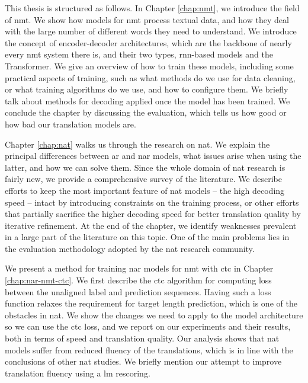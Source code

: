 

\vspace{\baselineskip}

This thesis is structured as follows.
%
In Chapter \ref{chap:nmt}, we introduce the field of \ac{nmt}. We show how
models for \ac{nmt} process textual data, and how they deal with the large
number of different words they need to understand. We introduce the concept of
encoder-decoder architectures, which are the backbone of nearly every \ac{nmt}
system there is, and their two types, \acs{rnn}-based models and the
Transformer. We give an overview of how to train these models, including some
practical aspects of training, such as what methods do we use for data
cleaning, or what training algorithms do we use, and how to configure them. We
briefly talk about methods for decoding applied once the model has been
trained. We conclude the chapter by discussing the evaluation, which tells us
how good or how bad our translation models are.

Chapter \ref{chap:nat} walks us through the research on \ac{nat}. We explain
the principal differences between \acl{ar} and \acl{nar} models, what issues
arise when using the latter, and how we can solve them.  Since the whole domain
of \ac{nat} research is fairly new, we provide a comprehensive survey of the
literature. We describe efforts to keep the most important feature of \ac{nat}
models -- the high decoding speed -- intact by introducing constraints on the
training process, or other efforts that partially sacrifice the higher decoding
speed for better translation quality by iterative refinement. At the end of the
chapter, we identify weaknesses prevalent in a large part of the literature on
this topic. One of the main problems lies in the evaluation methodology adopted
by the \ac{nat} research community.

We present a method for training \acl{nar} models for \ac{nmt} with \ac{ctc} in
Chapter \ref{chap:nar-nmt-ctc}. We first describe the \ac{ctc} algorithm for
computing loss between the unaligned label and prediction sequences. Having
such a loss function relaxes the requirement for target length prediction,
which is one of the obstacles in \ac{nat}. We show the changes we need to apply
to the model architecture so we can use the \ac{ctc} loss, and we report on our
experiments and their results, both in terms of speed and translation quality.
Our analysis shows that \ac{nat} models suffer from reduced fluency of the
translations, which is in line with the conclusions of other \ac{nat} studies.
We briefly mention our attempt to improve translation fluency using a \acl{lm}
rescoring.


